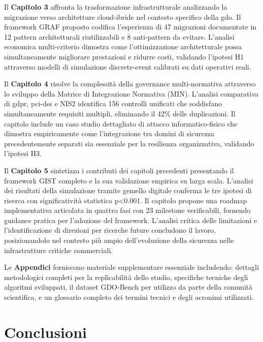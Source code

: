 Il \textbf{Capitolo 3} affronta la trasformazione infrastrutturale analizzando la migrazione verso architetture cloud-ibride nel contesto specifico della \gls{gdo}. Il framework GRAF proposto codifica l'esperienza di 47 migrazioni documentate in 12 pattern architetturali riutilizzabili e 8 anti-pattern da evitare. L'analisi economica multi-criterio dimostra come l'ottimizzazione architetturale possa simultaneamente migliorare prestazioni e ridurre costi, validando l'ipotesi H1 attraverso modelli di simulazione discrete-event calibrati su dati operativi reali.

Il \textbf{Capitolo 4} risolve la complessità della governance multi-normativa attraverso lo sviluppo della Matrice di Integrazione Normativa (MIN). L'analisi comparativa di \gls{gdpr}, \gls{pci-dss} e NIS2 identifica 156 controlli unificati che soddisfano simultaneamente requisiti multipli, eliminando il 42\% delle duplicazioni. Il capitolo include un caso studio dettagliato di attacco informatico-fisico che dimostra empiricamente come l'integrazione tra domini di sicurezza precedentemente separati sia essenziale per la resilienza organizzativa, validando l'ipotesi H3.

Il \textbf{Capitolo 5} sintetizza i contributi dei capitoli precedenti presentando il framework GIST completo e la sua validazione empirica su larga scala. L'analisi dei risultati della simulazione tramite gemello digitale conferma le tre ipotesi di ricerca con significatività statistica p<0.001. Il capitolo propone una roadmap implementativa articolata in quattro fasi con 23 milestone verificabili, fornendo guidance pratica per l'adozione del framework. L'analisi critica delle limitazioni e l'identificazione di direzioni per ricerche future concludono il lavoro, posizionandolo nel contesto più ampio dell'evoluzione della sicurezza nelle infrastrutture critiche commerciali.

Le \textbf{Appendici} forniscono materiale supplementare essenziale includendo: dettagli metodologici completi per la replicabilità dello studio, specifiche tecniche degli algoritmi sviluppati, il dataset GDO-Bench per utilizzo da parte della comunità scientifica, e un glossario completo dei termini tecnici e degli acronimi utilizzati.

\section{\texorpdfstring{Conclusioni}{1.6 - Conclusioni}}
\label{sec:conclusioni_cap1}

